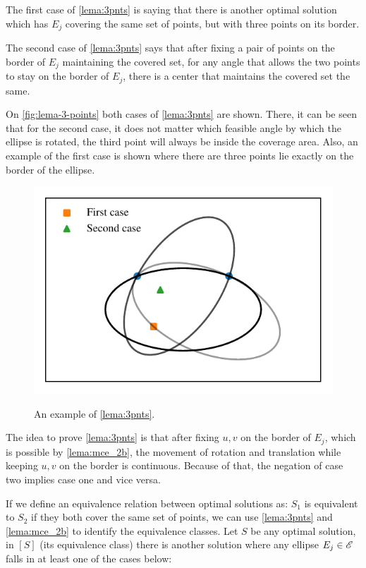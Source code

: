 The first case of \autoref{lema:3pnts} is saying that there is another optimal solution which has $E_j$ covering the same set of points, but with three points on its border. 

The second case of \autoref{lema:3pnts} says that after fixing a pair of points on the border of $E_j$ maintaining the covered set, for any angle that allows the two points to stay on the border of $E_j$, there is a center that maintains the covered set the same.

On \autoref{fig:lema-3-points} both cases of \autoref{lema:3pnts} are shown. There, it can be seen that for the second case, it does not matter which feasible angle by which the ellipse is rotated, the third point will always be inside the coverage area. Also, an example of the first case is shown where there are three points lie exactly on the border of the ellipse.

\begin{figure}
	\centering
	\caption{An example of \autoref{lema:3pnts}.}
	\includegraphics{tex/figures/scripts/lema-3-points}
	\fautor
	\label{fig:lema-3-points}
\end{figure}

The idea to prove \autoref{lema:3pnts} is that after fixing $u, v$ on the border of $E_j$, which is possible by \autoref{lema:mce_2b}, the movement of rotation and translation while keeping $u, v$ on the border is continuous. Because of that, the negation of case two implies case one and vice versa.


If we define an equivalence relation between optimal solutions as: $S_1$ is equivalent to $S_2$ if they both cover the same set of points, we can use \autoref{lema:3pnts} and \autoref{lema:mce_2b} to identify the equivalence classes. Let $S$ be any optimal solution, in $[S]$ (its equivalence class) there is another solution where any ellipse $E_j \in \mathscr{E}$ falls in at least one of the cases below:

